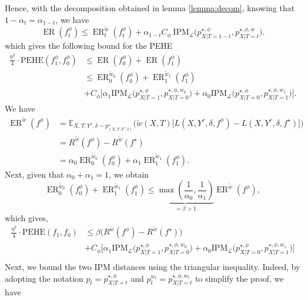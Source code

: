 \documentclass[12pt]{article}
\theoremstyle{plain}
\theoremstyle{definition}
\theoremstyle{remark}
\DeclareMathOperator{\ER}{\text{ER}}
\begin{document}
Hence, with the decomposition obtained in lemma \ref{lemma:decom}, knowing that $1-\alpha_t = \alpha_{1-t}$, we have
\begin{equation}
\ER( f_t^\phi) \leq \ER^{\tilde{w}}_{t}( f_t^\phi) +\alpha _{1-t}C_{\phi } \ \text{IPM}_{\mathcal{L}}\Big(  p^{\star,\phi}_{X | T=1-t}, p^{\star,\phi,w}_{X | T=t}\Big).
\end{equation}
which gives the following bound for the PEHE
\begin{align*}
\label{motiveloss}
    \frac{\eta^2}{4} \cdot \text{PEHE}(f_1^\phi,f_0^\phi)  &\leq \ER(f_0^\phi) + \ER(f_1^\phi) \\
    & \leq \ER^{\tilde{w}_0}_{0}( f_0^\phi) +\ER^{\tilde{w}_1}_{1}( f_1^\phi) \\
    &+C_{\phi }  \Big[ \alpha _{1}\text{IPM}_{\mathcal{L}}\Big(  p^{\star,\phi}_{X | T=1}, p^{\star,\phi,w_0}_{X | T=0}\Big) + \alpha _{0}\text{IPM}_{\mathcal{L}}\Big(  p^{\star,\phi}_{X | T=0}, p^{\star,\phi,w_1}_{X | T=1}\Big)\Big].
\end{align*}
We have 
\begin{align*}
    \ER^{\tilde{w}}(f^\phi) &= \mathbb{E}_{X,T,Y^c,\delta \sim p^\star_{(X,T,Y^c,\delta)}}\Big(\tilde{w}(X,T)\Big[L(X,Y^c,\delta,f^\phi)-L(X,Y^c,\delta,f^{\star})\Big]\Big)\\
    &= R^{\tilde{w}}(f^\phi) - R^{\tilde{w}}(f^{\star}) \\
    &= \alpha_0 \ER^{\tilde{w}_0}_0( f_0^\phi) + \alpha_1 \ER^{\tilde{w}_1}_1( f_1^\phi).
\end{align*}
Next, given that $\alpha_0 + \alpha_1=1$, we obtain
\begin{equation*}
    \ER^{\tilde{w}_0}_0( f_0^\phi) + \ER^{\tilde{w}_1}_1( f_1^\phi) \leq \underbrace{\max(\frac{1}{\alpha_0},\frac{1}{\alpha_1})}_{=\beta >1}   \ER^{\tilde{w}}(f^\phi),
\end{equation*}
which gives,
\begin{align*}
        \frac{\eta^2}{4} \cdot \text{PEHE}(f_1,f_0)  &\leq \beta \Big( R^{\tilde{w}}(f^\phi) - R^{\tilde{w}}(f^{\star}) \Big)  \\
    &+C_{\phi }  \Big[ \alpha _{1}\text{IPM}_{\mathcal{L}}\Big(  p^{\star,\phi}_{X | T=1}, p^{\star,\phi,w_0}_{X | T=0}\Big) + \alpha _{0}\text{IPM}_{\mathcal{L}}\Big(  p^{\star,\phi}_{X | T=0}, p^{\star,\phi,w_1}_{X | T=1}\Big)\Big]\\
\end{align*}
Next, we bound the two IPM distances using the triangular inequality. Indeed, by adopting the notation $p_t = p^{\star,\phi}_{X | T=t}$ and $p_t^{w_t} = p^{\star,\phi,w_t}_{X | T=t}$  to simplify the proof, we have 
\end{document}

